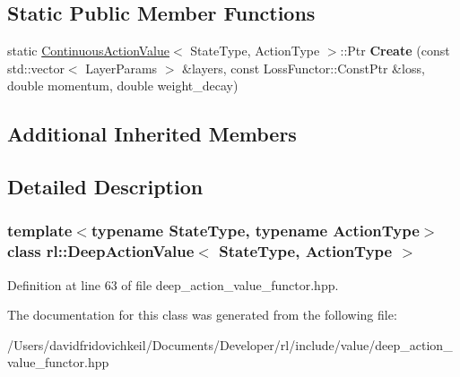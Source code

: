 \subsection*{Static Public Member Functions}
\begin{DoxyCompactItemize}
\item 
\hypertarget{classrl_1_1_deep_action_value_a28d5810e8871bde597b70fcb5a066ab0}{}\label{classrl_1_1_deep_action_value_a28d5810e8871bde597b70fcb5a066ab0} 
static \hyperlink{classrl_1_1_continuous_action_value}{Continuous\+Action\+Value}$<$ State\+Type, Action\+Type $>$\+::Ptr {\bfseries Create} (const std\+::vector$<$ Layer\+Params $>$ \&layers, const Loss\+Functor\+::\+Const\+Ptr \&loss, double momentum, double weight\+\_\+decay)
\end{DoxyCompactItemize}
\subsection*{Additional Inherited Members}


\subsection{Detailed Description}
\subsubsection*{template$<$typename State\+Type, typename Action\+Type$>$\newline
class rl\+::\+Deep\+Action\+Value$<$ State\+Type, Action\+Type $>$}



Definition at line 63 of file deep\+\_\+action\+\_\+value\+\_\+functor.\+hpp.



The documentation for this class was generated from the following file\+:\begin{DoxyCompactItemize}
\item 
/\+Users/davidfridovichkeil/\+Documents/\+Developer/rl/include/value/deep\+\_\+action\+\_\+value\+\_\+functor.\+hpp\end{DoxyCompactItemize}
